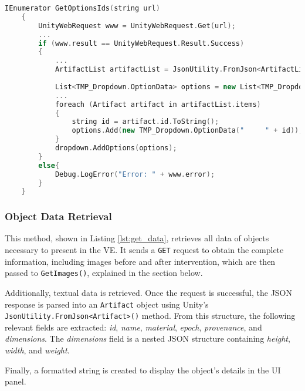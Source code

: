 \begin{lstlisting}[language=C++, caption={Method used to load artifact IDs and define as options in the Dropdown.}, label={lst:artifact_ids}]
      IEnumerator GetOptionsIds(string url)
    {
        UnityWebRequest www = UnityWebRequest.Get(url);
        ...
        if (www.result == UnityWebRequest.Result.Success)
        {
            ...
            ArtifactList artifactList = JsonUtility.FromJson<ArtifactList>(wrappedJson);
            
            List<TMP_Dropdown.OptionData> options = new List<TMP_Dropdown.OptionData>();
            ...
            foreach (Artifact artifact in artifactList.items)
            {
                string id = artifact.id.ToString();
                options.Add(new TMP_Dropdown.OptionData("     " + id));
            }
            dropdown.AddOptions(options);
        }
        else{
            Debug.LogError("Error: " + www.error);
        }
    }
\end{lstlisting}


\subsubsection{Object Data Retrieval}
\label{sec:data_retrieval}
This method, shown in Listing \ref{lst:get_data}, retrieves all data of objects necessary to present in the \gls{VE}.  
It sends a \texttt{GET} request to obtain the complete information, including images before and after intervention, which are then passed to \texttt{GetImages()}, explained in the section below.  

Additionally, textual data is retrieved. Once the request is successful, the JSON response is parsed into an \texttt{Artifact} object using Unity's \texttt{JsonUtility.FromJson<Artifact>()} method.  
From this structure, the following relevant fields are extracted: \emph{id}, \emph{name}, \emph{material}, \emph{epoch}, \emph{provenance}, and \emph{dimensions}.  
The \emph{dimensions} field is a nested JSON structure containing \emph{height}, \emph{width}, and \emph{weight}.  

Finally, a formatted string is created to display the object's details in the \gls{UI} panel.

